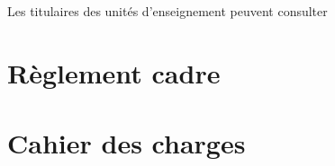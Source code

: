 \documentclass[a4paper,11pt]{report}
\begin{document}
Les titulaires des unités d'enseignement peuvent consulter





\appendix
\renewcommand{\partname}{Annexe}
\setcounter{part}{0}%
\part{Règlement cadre}\label{an:regl-cadre}


\part{Cahier des charges}

\end{document}
